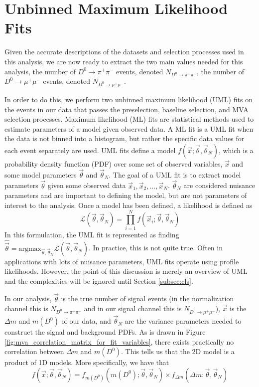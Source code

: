 \section{Unbinned Maximum Likelihood Fits}
\label{sec:UML}

Given the accurate descriptions of the datasets and selection processes used in this analysis, we are now ready to extract the two main values needed for this analysis, the number of $D^0 \to \pi^+ \pi^-$ events, denoted $N_{D^0 \to \pi^+ \pi^-}$, the number of $D^0 \to \mu^+ \mu^-$ events, denoted $N_{D^0 \to \mu^+ \mu^-}$.

In order to do this, we perform two unbinned maximum likelihood (UML) fits on the events in our data that passes the preselection, baseline selection, and MVA selection processes. Maximum likelihood (ML) fits are statistical methods used to estimate parameters of a model given observed data. A ML fit is a UML fit when the data is not binned into a histogram, but rather the specific data values for each event separately are used. UML fits define a model $f(\vec{x}; \vec{\theta}, \vec{\theta}_N)$, which is a probability density function (PDF) over some set of observed variables, $\vec{x}$ and some model parameters $\vec{\theta}$ and $\vec{\theta}_N$. The goal of a UML fit is to extract model parameters $\vec{\theta}$ given some observed data $\vec{x}_1, \vec{x}_2,...,\vec{x}_N$. $\vec{\theta}_N$ are considered nuisance parameters and are important to defining the model, but are not parameters of interest to the analysis. Once a model has been defined, a likelihood is defined as
\begin{equation}
    \mathcal{L}(\vec{\theta}, \vec{\theta}_N) = \prod^N_{i=1} f(\vec{x}_i; \vec{\theta}, \vec{\theta}_N)
\end{equation}
In this formulation, the UML fit is represented as finding $\hat{\vec{\theta}} = \text{argmax}_{\vec{\theta}, \vec{\theta}_N} \mathcal{L}(\vec{\theta}, \vec{\theta}_N)$. In practice, this is not quite true. Often in applications with lots of nuisance parameters, UML fits operate using profile likelihoods. However, the point of this discussion is merely an overview of UML and the complexities will be ignored until Section \ref{subsec:cls}. 

In our analysis, $\vec{\theta}$ is the true number of signal events (in the normalization channel this is $N_{D^0 \to \pi^+ \pi^-}$ and in our signal channel this is $N_{D^0 \to \mu^+ \mu^-}$), $\vec{x}$ is the $\Delta m$ and $m(D^0)$ of our data, and $\vec{\theta}_N$ are the variance parameters needed to construct the signal and background PDFs. As is drawn in Figure \ref{fig:mva_correlation_matrix_for_fit_variables}, there exists practically no correlation between $\Delta m$ and $m(D^0)$. This tells us that the 2D model is a product of 1D models. More specifically, we have that
\begin{equation}
    f(\vec{x}; \vec{\theta}, \vec{\theta}_N) = f_{m(D^0)}(m(D^0); \vec{\theta}, \vec{\theta}_N) \times f_{\Delta m}(\Delta m; \vec{\theta}, \vec{\theta}_N)
\end{equation}

